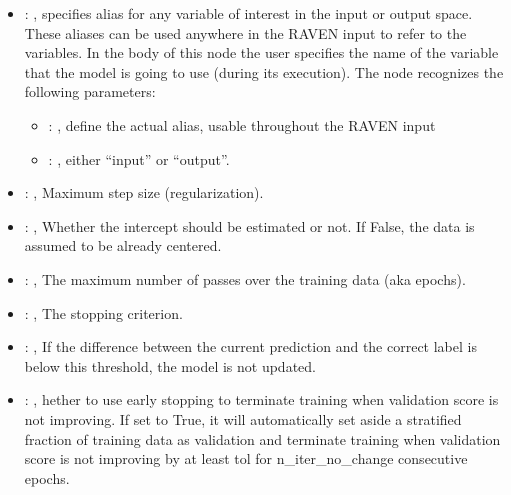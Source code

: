 \begin{itemize}
    \item {}: , 
      specifies alias for         any variable of interest in the input or output space. These
      aliases can be used anywhere in the RAVEN input to         refer to the variables. In the body
      of this node the user specifies the name of the variable that the model is going to use
      (during its execution).
      The  node recognizes the following parameters:
        \begin{itemize}
          \item {}: , 
            define the actual alias, usable throughout the RAVEN input
          \item {}: , 
            either ``input'' or ``output''.
      \end{itemize}

    \item {}: , 
      Maximum step size (regularization).

    \item {}: , 
      Whether the intercept should be estimated or not. If False,
      the data is assumed to be already centered.

    \item {}: , 
      The maximum number of passes over the training data (aka epochs).

    \item {}: , 
      The stopping criterion.

    \item {}: , 
      If the difference between the current prediction and the
      correct label is below this threshold, the model is not updated.

    \item {}: , 
      hether to use early stopping to terminate training when validation score is not
      improving. If set to True, it will automatically set aside a stratified fraction of training
      data as validation and terminate training when validation score is not improving by at least
      tol for n\_iter\_no\_change consecutive epochs.


\end{itemize}
